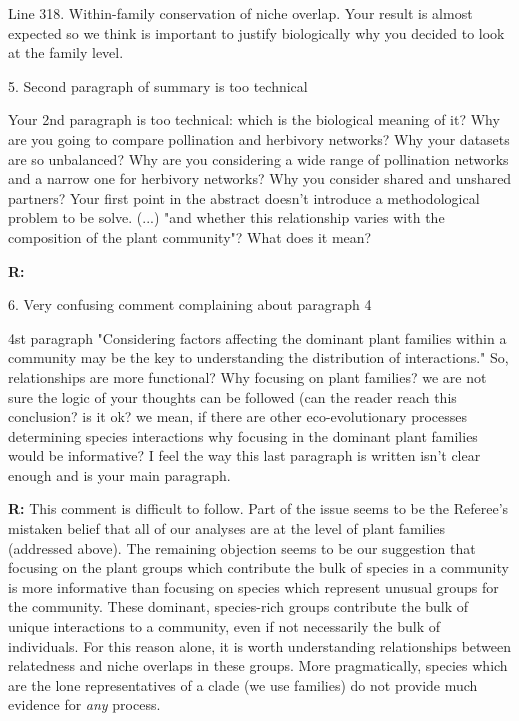 \documentclass[12pt]{letter}
\newenvironment{refquote}{\bigskip \begin{it}}{\end{it}\smallskip}
\begin{document}
		\begin{refquote}
			Line 318. Within-family conservation of niche overlap. Your result is almost expected so we think is important to justify biologically why you decided to look at the family level.
		\end{refquote}


	5. Second paragraph of summary is too technical

		\begin{refquote}
		Your 2nd paragraph is too technical: which is the biological meaning of it? Why are you going to compare pollination and herbivory networks? Why your datasets are so unbalanced? Why are you considering a wide range of pollination networks and a narrow one for herbivory networks? Why you consider shared and unshared partners? Your first point in the abstract doesn't introduce a methodological problem to be solve. (...) "and whether this relationship varies with the composition of the plant community"? What does it mean?
		\end{refquote}

		\textbf{R:}


	6. Very confusing comment complaining about paragraph 4

		\begin{refquote}
		4st paragraph "Considering factors affecting the dominant plant families within
		a community may be the key to understanding the distribution of interactions." So, relationships are more functional? Why focusing on plant families? we are not sure the logic of your thoughts can be followed (can the reader reach this conclusion? is it ok? we mean, if there are other eco-evolutionary processes determining species interactions why focusing in the dominant plant families would be informative? I feel the way this last paragraph is written isn't clear enough and is your main paragraph.
		\end{refquote}


		\textbf{R:} This comment is difficult to follow. Part of the issue seems to be the Referee's mistaken belief that all of our analyses are at the level of plant families (addressed above). The remaining objection seems to be our suggestion that focusing on the plant groups which contribute the bulk of species in a community is more informative than focusing on species which represent unusual groups for the community. These dominant, species-rich groups contribute the bulk of unique interactions to a community, even if not necessarily the bulk of individuals. For this reason alone, it is worth understanding relationships between relatedness and niche overlaps in these groups. More pragmatically, species which are the lone representatives of a clade (we use families) do not provide much evidence for \emph{any} process.
\end{document}
